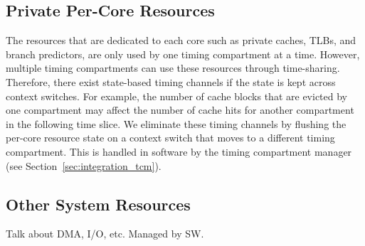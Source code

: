 \subsection{Private Per-Core Resources}

The resources that are dedicated to each core such as private caches,
TLBs, and branch predictors, are only used by one timing compartment at a time.
However, multiple timing compartments can use these resources through 
time-sharing. Therefore, there exist state-based timing channels if the state 
is
kept across context switches. For example, the number of cache blocks that
are evicted by one compartment may affect the number of cache hits for
another compartment in the following time slice.
We eliminate these timing channels by flushing the per-core resource state on a 
context switch that moves to a different timing compartment.
This is handled in software by the timing compartment manager (see 
Section~\ref{sec:integration_tcm}).

\subsection{Other System Resources}

Talk about DMA, I/O, etc. Managed by SW.
